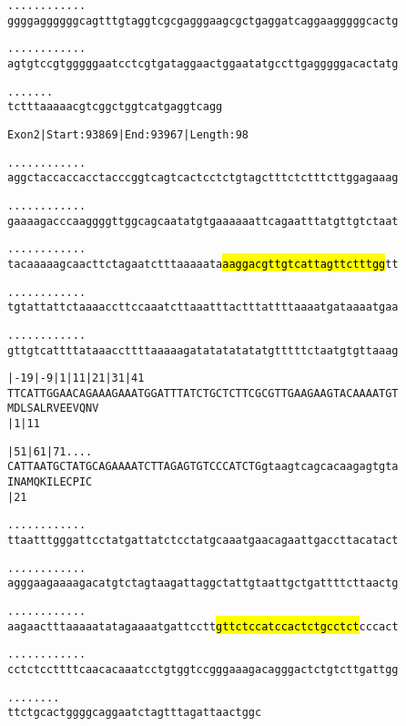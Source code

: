 \documentclass{article}
\begin{document}
\newpage
\begin{alltt}
  .    .    .    .    .    .    .    .    .    .    .    .  
ggggaggggggcagtttgtaggtcgcgagggaagcgctgaggatcaggaagggggcactg

  .    .    .    .    .    .    .    .    .    .    .    .  
agtgtccgtgggggaatcctcgtgataggaactggaatatgccttgagggggacactatg

  .    .    .    .    .    .    .
tctttaaaaacgtcggctggtcatgaggtcagg
\end{alltt}
\newpage
\begin{alltt}
Exon 2 | Start: 93869 | End: 93967 | Length: 98

.    .    .    .    .    .    .    .    .    .    .    .    
aggctaccaccacctacccggtcagtcactcctctgtagctttctctttcttggagaaag

.    .    .    .    .    .    .    .    .    .    .    .    
gaaaagacccaaggggttggcagcaatatgtgaaaaaattcagaatttatgttgtctaat

.    .    .    .    .    .    .    .    .    .    .    .    
tacaaaaagcaacttctagaatctttaaaaata\hl{aaggacgttgtcattagttctttgg}tt

.    .    .    .    .    .    .    .    .    .    .    .    
tgtattattctaaaaccttccaaatcttaaatttactttattttaaaatgataaaatgaa

.    .    .    .    .    .    .    .    .    .    .    .    
gttgtcattttataaaccttttaaaaagatatatatatatgtttttctaatgtgttaaag

|-19      |-9      |1        |11       |21       |31       |41
TTCATTGGAACAGAAAGAAATGGATTTATCTGCTCTTCGCGTTGAAGAAGTACAAAATGT
                   M  D  L  S  A  L  R  V  E  E  V  Q  N  V 
                   |1                            |11        

         |51       |61       |71           .    .    .    . 
CATTAATGCTATGCAGAAAATCTTAGAGTGTCCCATCTGgtaagtcagcacaagagtgta
 I  N  A  M  Q  K  I  L  E  C  P  I  C                      
                   |21                                      

   .    .    .    .    .    .    .    .    .    .    .    . 
ttaatttgggattcctatgattatctcctatgcaaatgaacagaattgaccttacatact

   .    .    .    .    .    .    .    .    .    .    .    . 
agggaagaaaagacatgtctagtaagattaggctattgtaattgctgattttcttaactg

   .    .    .    .    .    .    .    .    .    .    .    . 
aagaactttaaaaatatagaaaatgattcctt\hl{gttctccatccactctgcctct}cccact

   .    .    .    .    .    .    .    .    .    .    .    . 
cctctccttttcaacacaaatcctgtggtccgggaaagacagggactctgtcttgattgg

   .    .    .    .    .    .    .    .
ttctgcactggggcaggaatctagtttagattaactggc
\end{alltt}
\end{document}
